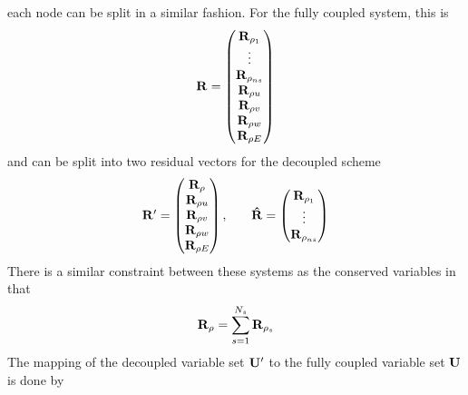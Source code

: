 \documentclass{article}   	%
\begin{document}
each node can be split in a similar fashion.  For the fully coupled system, this
is
\begin{equation}
  \mathbf R =
  \begin{pmatrix}
 		\mathbf R_{\rho_1}    \\
		\vdots          \\
		\mathbf R_{\rho_{ns}} \\
		\mathbf R_{\rho u}    \\
		\mathbf R_{\rho v}    \\
		\mathbf R_{\rho w}    \\
		\mathbf R_{\rho E}    \\
  \end{pmatrix}
  \label{res-fc}
\end{equation}
and can be split into two residual vectors for the decoupled scheme
\begin{equation}
	\begin{matrix}
		\mathbf{R}'=\begin{pmatrix}
      \mathbf R_{\rho}   \\
      \mathbf R_{\rho u} \\
			\mathbf R_{\rho v} \\
			\mathbf R_{\rho w} \\
			\mathbf R_{\rho E}
		\end{pmatrix},\quad &
		\mathbf{\hat{R}}=\begin{pmatrix}
      \mathbf R_{\rho_1} \\
			\vdots       \\
      \mathbf R_{\rho_{ns}}
		\end{pmatrix}
	\end{matrix}
  \label{decoupled-res}
\end{equation}
There is a similar constraint between these systems as the conserved variables
in that
\begin{equation}
  \mathbf R_{\rho} = \sum_{s=1}^{N_s}\mathbf R_{\rho_s}
  \label{res-constraint}
\end{equation}
The mapping of the decoupled variable set $\mathbf{U}'$ to the fully coupled variable
set $\mathbf U$ is done by
\end{document}
